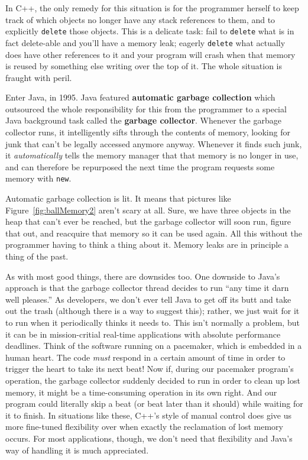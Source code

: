 In C++, the only remedy for this situation is for the programmer herself to
keep track of which objects no longer have any stack references to them, and
to explicitly \texttt{delete} those objects. This is a delicate task: fail to
\texttt{delete} what is in fact delete-able and you'll have a memory leak;
eagerly \texttt{delete} what actually does have other references to it and
your program will crash when that memory is reused by something else writing
over the top of it. The whole situation is fraught with peril.

Enter Java, in 1995. Java featured \textbf{automatic garbage collection} which
outsourced the whole responsibility for this from the programmer to a special
Java background task called the \textbf{garbage collector}. Whenever the
garbage collector runs, it intelligently sifts through the contents of memory,
looking for junk that can't be legally accessed anymore anyway. Whenever it
finds such junk, it \textit{automatically} tells the memory manager that that
memory is no longer in use, and can therefore be repurposed the next time the
program requests some memory with \texttt{new}.

Automatic garbage collection is lit. It means that pictures like
Figure~\ref{fig:ballMemory2} aren't scary at all. Sure, we have three objects
in the heap that can't ever be reached, but the garbage collector will soon
run, figure that out, and reacquire that memory so it can be used again. All
this without the programmer having to think a thing about it. Memory leaks are
in principle a thing of the past.

As with most good things, there are downsides too. One downside to Java's
approach is that the garbage collector thread decides to run ``any time it
darn well pleases.'' As developers, we don't ever tell Java to get off its
butt and take out the trash (although there is a way to suggest this); rather,
we just wait for it to run when it periodically thinks it needs to. This isn't
normally a problem, but it can be in mission-critial real-time applications
with absolute performance deadlines. Think of the software running on a
pacemaker, which is embedded in a human heart. The code \textit{must} respond
in a certain amount of time in order to trigger the heart to take its next
beat! Now if, during our pacemaker program's operation, the garbage collector
suddenly decided to run in order to clean up lost memory, it might be a
time-consuming operation in its own right. And our program could literally
skip a beat (or beat later than it should) while waiting for it to finish. In
situations like these, C++'s style of manual control does give us more
fine-tuned flexibility over when exactly the reclamation of lost memory
occurs. For most applications, though, we don't need that flexibility and
Java's way of handling it is much appreciated.

